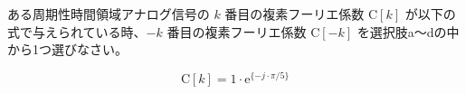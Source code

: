 ある周期性時間領域アナログ信号の $k$ 番目の複素フーリエ係数 $\textrm{C}[k]$ が以下の式で与えられている時、$-k$ 番目の複素フーリエ係数 $\textrm{C}[-k]$ を選択肢a〜dの中から1つ選びなさい。

\[
\textrm{C}[k] = 1 \cdot \textrm{e}^{\{ -j \cdot \pi/5 \}}
\]
